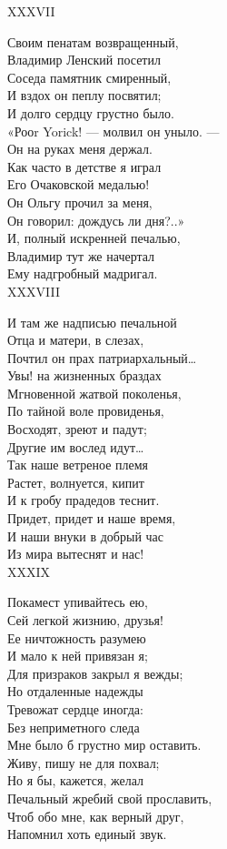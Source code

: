 XXXVII

Своим пенатам возвращенный,\\
Владимир Ленский посетил\\
Соседа памятник смиренный,\\
И вздох он пеплу посвятил;\\
И долго сердцу грустно было.\\
«Рооr Yorick! — молвил он уныло. —\\
Он на руках меня держал.\\
Как часто в детстве я играл\\
Его Очаковской медалью!\\
Он Ольгу прочил за меня,\\
Он говорил: дождусь ли дня?..»\\
И, полный искренней печалью,\\
Владимир тут же начертал\\
Ему надгробный мадригал.\\

XXXVIII

И там же надписью печальной\\
Отца и матери, в слезах,\\
Почтил он прах патриархальный…\\
Увы! на жизненных браздах\\
Мгновенной жатвой поколенья,\\
По тайной воле провиденья,\\
Восходят, зреют и падут;\\
Другие им вослед идут…\\
Так наше ветреное племя\\
Растет, волнуется, кипит\\
И к гробу прадедов теснит.\\
Придет, придет и наше время,\\
И наши внуки в добрый час\\
Из мира вытеснят и нас!\\

XXXIX

Покамест упивайтесь ею,\\
Сей легкой жизнию, друзья!\\
Ее ничтожность разумею\\
И мало к ней привязан я;\\
Для призраков закрыл я вежды;\\
Но отдаленные надежды\\
Тревожат сердце иногда:\\
Без неприметного следа\\
Мне было б грустно мир оставить.\\
Живу, пишу не для похвал;\\
Но я бы, кажется, желал\\
Печальный жребий свой прославить,\\
Чтоб обо мне, как верный друг,\\
Напомнил хоть единый звук.\\

